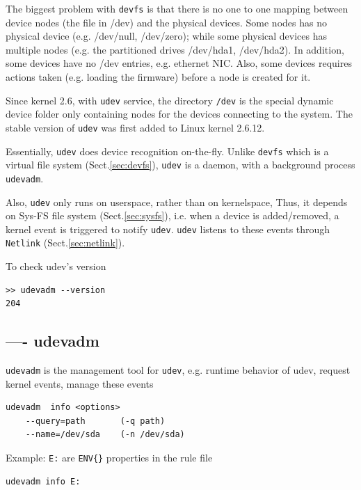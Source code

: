 \begin{mdframed}
The biggest problem with \verb!devfs! is that there is no one to one
mapping between device nodes (the file in /dev) and the physical devices. Some nodes has
no physical device (e.g. /dev/null, /dev/zero); while some physical devices has
multiple nodes (e.g. the partitioned drives /dev/hda1, /dev/hda2). In addition,
some devices have no /dev entries, e.g. ethernet NIC. Also, some devices
requires actions taken (e.g. loading the firmware) before a node is created for it.
\end{mdframed}

Since kernel 2.6, with \verb!udev! service, the directory \verb!/dev! is the
special dynamic device folder only containing nodes for the devices connecting
to the system.  The stable version of \verb!udev! was first added to Linux
kernel 2.6.12.

Essentially, \verb!udev! does device recognition on-the-fly.  Unlike
\verb!devfs! which is a virtual file system (Sect.\ref{sec:devfs}), \verb!udev!
is a daemon, with a background process \verb!udevadm!. 

Also, \verb!udev! only runs on userspace, rather than on kernelspace, Thus, it
depends on Sys-FS file system (Sect.\ref{sec:sysfs}), i.e.
when a device is added/removed, a kernel event is triggered to notify
\verb!udev!. \verb!udev! listens to these events through \verb!Netlink!
(Sect.\ref{sec:netlink}).

To check udev's version
\begin{verbatim}
>> udevadm --version
204
\end{verbatim}


\subsection{---- udevadm}
\label{sec:udevadm}

\verb!udevadm! is the management tool for \verb!udev!, e.g. runtime behavior of
udev, request kernel events, manage these events

\begin{verbatim}
udevadm  info <options>
    --query=path 	   (-q path)
    --name=/dev/sda    (-n /dev/sda)
\end{verbatim}

Example: \verb!E:! are \verb!ENV{}! properties in the rule file
\begin{verbatim}
udevadm info E:
\end{verbatim}

